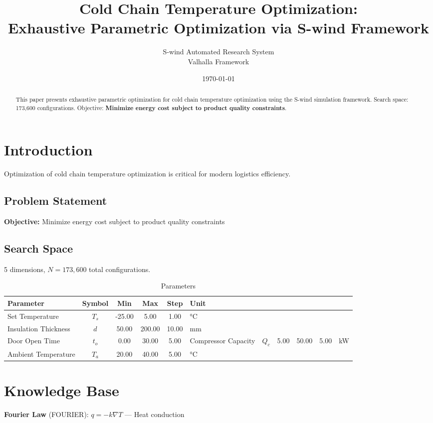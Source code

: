 \documentclass[11pt,twocolumn]{article}
\title{Cold Chain Temperature Optimization: \\Exhaustive Parametric Optimization via S-wind Framework}
\author{S-wind Automated Research System\\Valhalla Framework}
\date{\today}
\begin{document}
\maketitle

\begin{abstract}
This paper presents exhaustive parametric optimization for cold chain temperature optimization using the S-wind simulation framework.
Search space: 173,600 configurations. Objective: \textbf{Minimize energy cost subject to product quality constraints}.
\end{abstract}

\section{Introduction}
Optimization of cold chain temperature optimization is critical for modern logistics efficiency.

\subsection{Problem Statement}
\textbf{Objective:} Minimize energy cost subject to product quality constraints

\subsection{Search Space}
5 dimensions, $N = 173,600$ total configurations.

\begin{table}[h]
\centering
\caption{Parameters}
\begin{tabular}{@{}lccccl@{}}
\toprule
Parameter & Symbol & Min & Max & Step & Unit \\
\midrule
Set Temperature & $T_s$ & -25.00 & 5.00 & 1.00 & °C \\
Insulation Thickness & $d$ & 50.00 & 200.00 & 10.00 & mm \\
Door Open Time & $t_o$ & 0.00 & 30.00 & 5.00 & %
Compressor Capacity & $Q_c$ & 5.00 & 50.00 & 5.00 & kW \\
Ambient Temperature & $T_a$ & 20.00 & 40.00 & 5.00 & °C \\
\bottomrule
\end{tabular}
\end{table}

\section{Knowledge Base}
\textbf{Fourier Law} (FOURIER): $q = -k \nabla T$ --- Heat conduction
\end{document}
